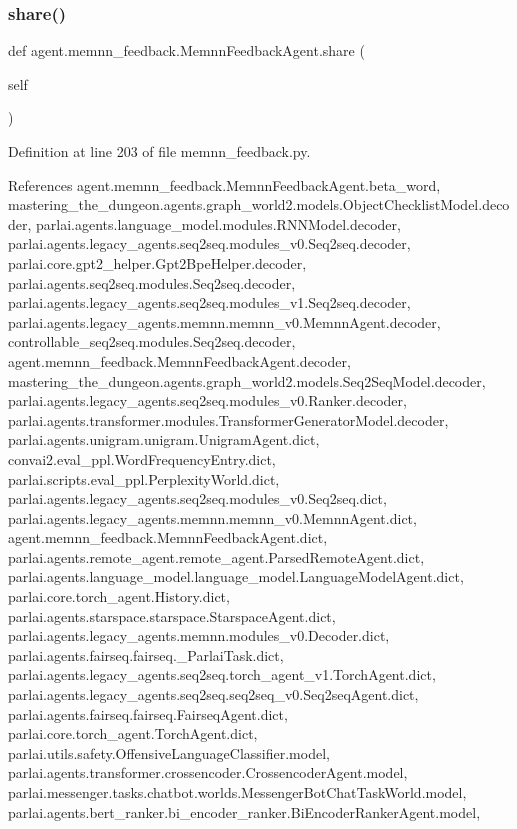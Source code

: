 \subsubsection{\texorpdfstring{share()}{share()}}
{\footnotesize\ttfamily def agent.\+memnn\+\_\+feedback.\+Memnn\+Feedback\+Agent.\+share (\begin{DoxyParamCaption}\item[{}]{self }\end{DoxyParamCaption})}



Definition at line 203 of file memnn\+\_\+feedback.\+py.



References agent.\+memnn\+\_\+feedback.\+Memnn\+Feedback\+Agent.\+beta\+\_\+word, mastering\+\_\+the\+\_\+dungeon.\+agents.\+graph\+\_\+world2.\+models.\+Object\+Checklist\+Model.\+decoder, parlai.\+agents.\+language\+\_\+model.\+modules.\+R\+N\+N\+Model.\+decoder, parlai.\+agents.\+legacy\+\_\+agents.\+seq2seq.\+modules\+\_\+v0.\+Seq2seq.\+decoder, parlai.\+core.\+gpt2\+\_\+helper.\+Gpt2\+Bpe\+Helper.\+decoder, parlai.\+agents.\+seq2seq.\+modules.\+Seq2seq.\+decoder, parlai.\+agents.\+legacy\+\_\+agents.\+seq2seq.\+modules\+\_\+v1.\+Seq2seq.\+decoder, parlai.\+agents.\+legacy\+\_\+agents.\+memnn.\+memnn\+\_\+v0.\+Memnn\+Agent.\+decoder, controllable\+\_\+seq2seq.\+modules.\+Seq2seq.\+decoder, agent.\+memnn\+\_\+feedback.\+Memnn\+Feedback\+Agent.\+decoder, mastering\+\_\+the\+\_\+dungeon.\+agents.\+graph\+\_\+world2.\+models.\+Seq2\+Seq\+Model.\+decoder, parlai.\+agents.\+legacy\+\_\+agents.\+seq2seq.\+modules\+\_\+v0.\+Ranker.\+decoder, parlai.\+agents.\+transformer.\+modules.\+Transformer\+Generator\+Model.\+decoder, parlai.\+agents.\+unigram.\+unigram.\+Unigram\+Agent.\+dict, convai2.\+eval\+\_\+ppl.\+Word\+Frequency\+Entry.\+dict, parlai.\+scripts.\+eval\+\_\+ppl.\+Perplexity\+World.\+dict, parlai.\+agents.\+legacy\+\_\+agents.\+seq2seq.\+modules\+\_\+v0.\+Seq2seq.\+dict, parlai.\+agents.\+legacy\+\_\+agents.\+memnn.\+memnn\+\_\+v0.\+Memnn\+Agent.\+dict, agent.\+memnn\+\_\+feedback.\+Memnn\+Feedback\+Agent.\+dict, parlai.\+agents.\+remote\+\_\+agent.\+remote\+\_\+agent.\+Parsed\+Remote\+Agent.\+dict, parlai.\+agents.\+language\+\_\+model.\+language\+\_\+model.\+Language\+Model\+Agent.\+dict, parlai.\+core.\+torch\+\_\+agent.\+History.\+dict, parlai.\+agents.\+starspace.\+starspace.\+Starspace\+Agent.\+dict, parlai.\+agents.\+legacy\+\_\+agents.\+memnn.\+modules\+\_\+v0.\+Decoder.\+dict, parlai.\+agents.\+fairseq.\+fairseq.\+\_\+\+Parlai\+Task.\+dict, parlai.\+agents.\+legacy\+\_\+agents.\+seq2seq.\+torch\+\_\+agent\+\_\+v1.\+Torch\+Agent.\+dict, parlai.\+agents.\+legacy\+\_\+agents.\+seq2seq.\+seq2seq\+\_\+v0.\+Seq2seq\+Agent.\+dict, parlai.\+agents.\+fairseq.\+fairseq.\+Fairseq\+Agent.\+dict, parlai.\+core.\+torch\+\_\+agent.\+Torch\+Agent.\+dict, parlai.\+utils.\+safety.\+Offensive\+Language\+Classifier.\+model, parlai.\+agents.\+transformer.\+crossencoder.\+Crossencoder\+Agent.\+model, parlai.\+messenger.\+tasks.\+chatbot.\+worlds.\+Messenger\+Bot\+Chat\+Task\+World.\+model, parlai.\+agents.\+bert\+\_\+ranker.\+bi\+\_\+encoder\+\_\+ranker.\+Bi\+Encoder\+Ranker\+Agent.\+model, 